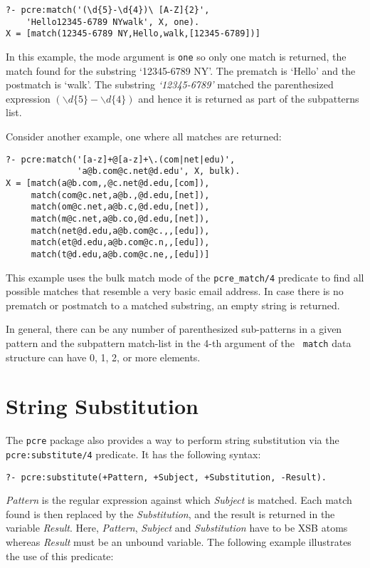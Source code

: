 \begin{verbatim}
?- pcre:match('(\d{5}-\d{4})\ [A-Z]{2}',
	'Hello12345-6789 NYwalk', X, one).
X = [match(12345-6789 NY,Hello,walk,[12345-6789])]
\end{verbatim}

In this example, the mode argument is \texttt{one} so only one match is
returned, 
the match found for the substring `12345-6789 NY'. The
prematch is `Hello' and the postmatch is `walk'. The substring
\textit{`12345-6789'} matched the parenthesized expression $( \backslash d
\lbrace 5 \rbrace - \backslash d \lbrace 4 \rbrace )$ and hence it is
returned as part of the subpatterns list.

Consider another example, one where all matches are returned:
\begin{verbatim}
?- pcre:match('[a-z]+@[a-z]+\.(com|net|edu)', 
              'a@b.com@c.net@d.edu', X, bulk).
X = [match(a@b.com,,@c.net@d.edu,[com]),
     match(com@c.net,a@b.,@d.edu,[net]),
     match(om@c.net,a@b.c,@d.edu,[net]),
     match(m@c.net,a@b.co,@d.edu,[net]),
     match(net@d.edu,a@b.com@c.,,[edu]),
     match(et@d.edu,a@b.com@c.n,,[edu]),
     match(t@d.edu,a@b.com@c.ne,,[edu])]
\end{verbatim}

This example uses the bulk match mode of the {\tt pcre\_match/4}
predicate to find
all possible matches that resemble a very basic email address. In case
there is no prematch or postmatch to a matched substring, an empty string
is returned.

In general, there can be any number of parenthesized sub-patterns in a given
pattern and the subpattern match-list in the 4-th argument of the {\tt
  match} data structure can have 0, 1, 2, or more elements. 


\section{String Substitution}


The {\tt pcre} package also provides a way to perform string substitution
via the {\tt pcre:substitute/4}  predicate. It has the following syntax:

\begin{verbatim}
?- pcre:substitute(+Pattern, +Subject, +Substitution, -Result).
\end{verbatim}

\textit{Pattern} is the regular expression against which \textit{Subject}
is matched. Each match found is then replaced by the \textit{Substitution},
and the result is returned in the variable \textit{Result}. Here,
\textit{Pattern}, \textit{Subject} and \textit{Substitution} have to be XSB
atoms whereas \textit{Result} must be an unbound variable. The following
example illustrates the use of this predicate:

